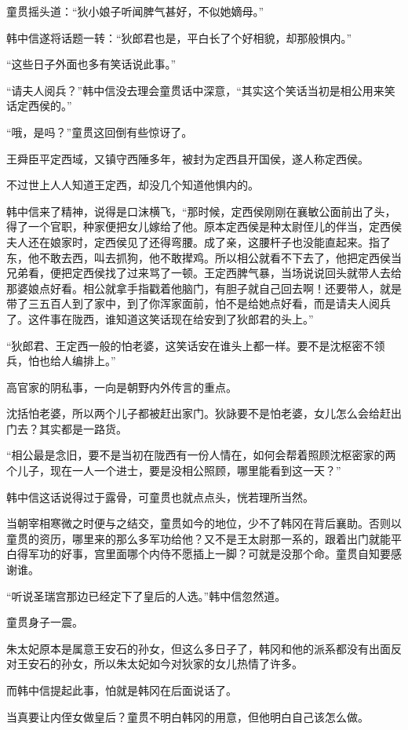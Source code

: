 童贯摇头道：“狄小娘子听闻脾气甚好，不似她嫡母。”

韩中信遂将话题一转：“狄郎君也是，平白长了个好相貌，却那般惧内。”

“这些日子外面也多有笑话说此事。”

“请夫人阅兵？”韩中信没去理会童贯话中深意，“其实这个笑话当初是相公用来笑话定西侯的。”

“哦，是吗？”童贯这回倒有些惊讶了。

王舜臣平定西域，又镇守西陲多年，被封为定西县开国侯，遂人称定西侯。

不过世上人人知道王定西，却没几个知道他惧内的。

韩中信来了精神，说得是口沫横飞，“那时候，定西侯刚刚在襄敏公面前出了头，得了一个官职，种家便把女儿嫁给了他。原本定西侯是种太尉侄儿的伴当，定西侯夫人还在娘家时，定西侯见了还得弯腰。成了亲，这腰杆子也没能直起来。指了东，他不敢去西，叫去抓狗，他不敢撵鸡。所以相公就看不下去了，他把定西侯当兄弟看，便把定西侯找了过来骂了一顿。王定西脾气暴，当场说说回头就带人去给那婆娘点好看。相公就拿手指戳着他脑门，有胆子就自己回去啊！还要带人，就是带了三五百人到了家中，到了你浑家面前，怕不是给她点好看，而是请夫人阅兵了。这件事在陇西，谁知道这笑话现在给安到了狄郎君的头上。”

“狄郎君、王定西一般的怕老婆，这笑话安在谁头上都一样。要不是沈枢密不领兵，怕也给人编排上。”

高官家的阴私事，一向是朝野内外传言的重点。

沈括怕老婆，所以两个儿子都被赶出家门。狄詠要不是怕老婆，女儿怎么会给赶出门去？其实都是一路货。

“相公最是念旧，要不是当初在陇西有一份人情在，如何会帮着照顾沈枢密家的两个儿子，现在一人一个进士，要是没相公照顾，哪里能看到这一天？”

韩中信这话说得过于露骨，可童贯也就点点头，恍若理所当然。

当朝宰相寒微之时便与之结交，童贯如今的地位，少不了韩冈在背后襄助。否则以童贯的资历，哪里来的那么多军功给他？又不是王太尉那一系的，跟着出门就能平白得军功的好事，宫里面哪个内侍不愿插上一脚？可就是没那个命。童贯自知要感谢谁。

“听说圣瑞宫那边已经定下了皇后的人选。”韩中信忽然道。

童贯身子一震。

朱太妃原本是属意王安石的孙女，但这么多日子了，韩冈和他的派系都没有出面反对王安石的孙女，所以朱太妃如今对狄家的女儿热情了许多。

而韩中信提起此事，怕就是韩冈在后面说话了。

当真要让内侄女做皇后？童贯不明白韩冈的用意，但他明白自己该怎么做。

